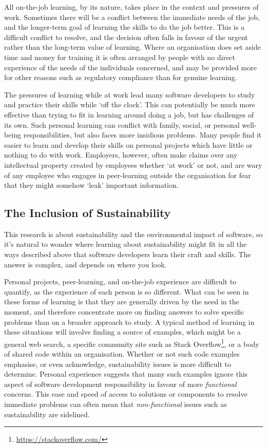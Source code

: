 All on-the-job learning, by its nature, takes place in the context and pressures of work. Sometimes there will be a conflict between the immediate needs of the job, and the longer-term goal of learning the skills to do the job better. This is a difficult conflict to resolve, and the decision often falls in favour of the urgent rather than the long-term value of learning. Where an organisation does set aside time and money for training it is often arranged by people with no direct experience of the needs of the individuals concerned, and may be provided more for other reasons such as regulatory compliance than for genuine learning.

The pressures of learning while at work lead many software developers to study and practice their skills while `off the clock'. This can potentially be much more effective than trying to fit in learning around doing a job, but has challenges of its own. Such personal learning can conflict with family, social, or personal well-being responsibilities, but also faces more insidious problems. Many people find it easier to learn and develop their skills on personal projects which have little or nothing to do with work. Employers, however, often make claims over any intellectual property created by employees whether `at work' or not, and are wary of any employee who engages in peer-learning outside the organisation for fear that they might somehow `leak' important information.

\subsection*{The Inclusion of Sustainability}

This research is about sustainability and the environmental impact of software, so it's natural to wonder where learning about sustainability might fit in all the ways described above that software developers learn their craft and skills. The answer is complex, and depends on where you look.

Personal projects, peer-learning, and on-the-job experience are difficult to quantify, as the experience of each person is so different. What can be seen in these forms of learning is that they are generally driven by the need in the moment, and therefore concentrate more on finding answers to solve specific problems than on a broader approach to study. A typical method of learning in these situations will involve finding a source of examples, which might be a general web search, a specific community site such as Stack Overflow\footnote{\url{https://stackoverflow.com/}}, or a body of shared code within an organisation. Whether or not such code examples emphasise, or even acknowledge, sustainability issues is more difficult to determine. Personal experience suggests that many such examples ignore this aspect of software development responsibility in favour of more \emph{functional} concerns. This ease and speed of access to solutions or components to resolve immediate problems can often mean that \emph{non-functional} issues such as sustainability are sidelined.

